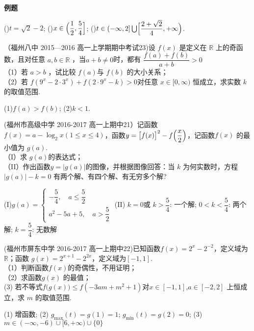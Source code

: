 \begin{exercise}{\large \bf 例\hspace{0.6em}题}
      \begin{answer}
      ()$t=\sqrt{2}-2$;
      ()$x\in\Bigl(\dfrac12,\dfrac54\Bigr]$;
      ()$t\in(-\infty,2]\bigcup \Bigl[\dfrac{2+\sqrt{2}}{4},+\infty\Bigr)$.
      \end{answer}
    \vspace{21em}
    \item%
      （福州八中 2015—2016 高一上学期期中考试23)设 $f (x )$ 是定义在 $\mathbb{R}$ 上的奇函数，且对任意 $a,b\in \mathbb{R}$ ，当$a+b\neq0$时，都有 $\dfrac{f(a)+f(b)}{a+b}>0$\\
      （1）若 $a> b$ ，试比较 $f (a ) $与 $f (b)$ 的大小关系；\\
      （2）若 $f (9^x- 2\cdot 3^x )+ f ( 2\cdot 9^x-k )> 0 $对任意 $x\in[0,\infty )$ 恒成立，求实数 $k$ 的取值范围.
      \begin{answer}
        (1)$f(a)>f(b)$;
        (2)$k<1$.
      \end{answer}
    \vspace{22em}
    \item%
      (福州市高级中学 2016-2017 高一上期中21）记函数 $f (x )=a-\log_2{x}(1\leq x\leq 4)$，函数$y=\bigl[f(x)\bigr]^2-f\Bigl(\dfrac x2\Bigr)$，记函数$f(x)$ 的最小值为 $g(a)$.\\
      （I）求 $g(a) $的表达式；\\
      （II）作出函数$y=|g(a)|$的图像，并根据图像回答：当 $k$ 为何实数时，方程$|g( a)|-k=0$ 有两个解、有四个解、有无穷多个解?
      \begin{answer}
        (I)$g(a)=\begin{cases}-\dfrac54,\quad a\leq\dfrac52\\a^2-5a+5,\quad a>\dfrac52\end{cases} $
        (II) $k=0$或 $k>\dfrac54 $: 一个解;  $0<k<\dfrac54$: 两个解;   $k=\dfrac54$: 无数解
      \end{answer}
    \vspace{20em}
    \item%
      (福州市屏东中学 2016-2017 高一上期中22)已知函数$f(x)=2^x-2^{-2} $，定义域为$\mathbb{R} $；函数 $g(x)=2^{x+1}-2^{2x} $，定义域为$[-1,1] $.\\
      （1）判断函数$f(x) $的奇偶性，不用证明；\\
      （2）求函数$g(x) $ 的最值；\\
       (3) 若不等式$f\bigl(g(x)\bigr)\leq f(-3am+m^2+1) $对$x\in[-1,1] $,$a\in[-2,2] $ 上恒成立，求 $m$ 的取值范围.
       \begin{answer}
         (1) 增函数;
         (2) $g_{\max}(t)=g(1)=1 $; $g_{\min}(t)=g(2)=0 $;
         (3) $m\in (-\infty,-6)\cup[6,+\infty)\cup\{0\} $
      \end{answer}
    \vspace{20em}
  \end{exercise}
\newpage
